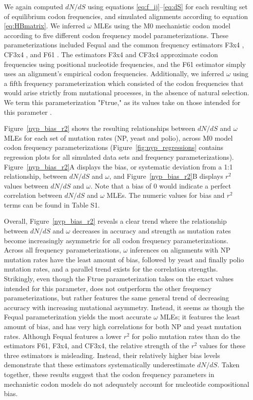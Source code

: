 \documentclass{pnastwo}
\begin{document}
We again computed $dN/dS$ using equations \eqref{eq:f_ij}--\eqref{eq:dS} for each resulting set of equilibrium codon frequencies, and simulated alignments according to equation \eqref{eq:HBmatrix}. We inferred $\omega$ MLEs using the M0 mechanistic codon model  according to five different codon frequency model parameterizations. These parameterizations included Fequal \cite{Yang2006} and the common frequency estimators F3x4 \cite{MuseGaut1994}, CF3x4 \cite{Pond2010}, and F61 \cite{GoldmanYang1994}. The estimators F3x4 and CF3x4 approximate codon frequencies using positional nucleotide frequencies, and the F61 estimator simply uses an alignment's empirical codon frequencies. Additionally, we inferred $\omega$ using a fifth frequency parameterization which consisted of the codon frequencies that would arise strictly from mutational processes, in the absence of natural selection. We term this parameterization "Ftrue," as its values take on those intended for this parameter \cite{GoldmanYang1994,MuseGaut1994,YN00,Yang2006}.


Figure~\ref{nyp_bias_r2} shows the resulting relationships between $dN/dS$ and $\omega$ MLEs for each set of mutation rates (NP, yeast and polio), across M0 model codon frequency parameterizations (Figure~\ref{fig:nyp_regressions} contains regression plots for all simulated data sets and frequency parameterizations). Figure~\ref{nyp_bias_r2}A displays the bias, or systematic deviation from a 1:1 relationship, between $dN/dS$ and $\omega$, and Figure~\ref{nyp_bias_r2}B displays $r^2$ values between $dN/dS$ and $\omega$. Note that a bias of 0 would indicate a perfect correlation between $dN/dS$ and $\omega$ MLEs. The numeric values for bias and $r^2$ terms can be found in Table S1.

Overall, Figure~\ref{nyp_bias_r2} reveals a clear trend where the relationship between $dN/dS$ and $\omega$ decreases in accuracy and strength as mutation rates become increasingly asymmetric for all codon frequency parameterizations. Across all frequency parameterizations, $\omega$ inferences on alignments with NP mutation rates have the least amount of bias, followed by yeast and finally polio mutation rates, and a parallel trend exists for the correlation strengths. Strikingly, even though the Ftrue parameterization takes on the exact values intended for this parameter, does not outperform the other frequency parameterizations, but rather features the same general trend of decreasing accuracy with increasing mutational asymmetry. Instead, it seems as though the Fequal parameterization yields the most accurate $\omega$ MLEs; it features the least amount of bias, and has very high correlations for both NP and yeast mutation rates. Although Fequal features a lower $r^2$ for polio mutation rates than do the estimators F61, F3x4, and CF3x4, the relative strength of the $r^2 $ values for these three estimators is misleading. Instead, their relatively higher bias levels demonstrate that these estimators systematically underestimate $dN/dS$. Taken together, these results suggest that the codon frequency parameters in mechanistic codon models do not adequately account for nucleotide compositional bias. 
\end{document}
